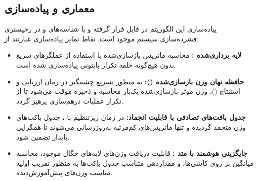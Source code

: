 \subsection{معماری و پیاده‌سازی}
پیاده‌سازی این الگوریتم در فایل  قرار گرفته و با شناسه‌های  و  در رجیستری فشرده‌سازی سیستم موجود است. نقاط تمایز پیاده‌سازی عبارتند از:
\begin{itemize}
    \item \textbf{لایه برداری‌شده :} محاسبه ماتریس بازسازی‌شده با استفاده از عملگرهای سریع  بدون هیچ‌گونه حلقه تکرار پایتونی پیاده‌سازی شده است.
    \item \textbf{حافظه نهان وزن بازسازی‌شده ():} به منظور تسریع چشمگیر در زمان ارزیابی و استنتاج ()، وزن موثر بازسازی‌شده یک‌بار محاسبه و ذخیره موقت می‌شود تا از تکرار عملیات درهم‌سازی پرهیز گردد.
    \item \textbf{جدول بافت‌های تصادفی با قابلیت انجماد:} در زمان ریزتنظیم با ، جدول باکت‌های وزن منجمد گردیده و تنها ماتریس‌های کم‌مرتبه به‌روزرسانی می‌شوند تا همگرایی پایدار تضمین شود.
    \item \textbf{جایگزینی هوشمند با متد :} قابلیت دریافت وزن‌های لایه‌های چگال موجود، محاسبه میانگین بر روی کاشی‌ها، و مقداردهی متناسب جدول باکت‌ها به منظور تقریب اولیه مناسب وزن‌های پیش‌آموزش‌دیده.
\end{itemize}
